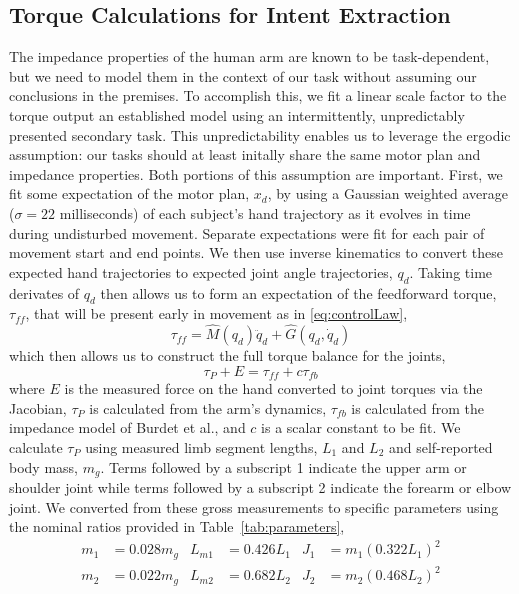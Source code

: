 \subsection*{Torque Calculations for Intent Extraction}
The impedance properties of the human arm are known to be task-dependent\cite{gomi1998task}, but we need to model them in the context of our task without assuming our conclusions in the premises. To accomplish this, we fit a linear scale factor to the torque output an established model using an intermittently, unpredictably presented secondary task. This unpredictability enables us to leverage the ergodic assumption: our tasks should at least initally share the same motor plan and impedance properties. Both portions of this assumption are important. First, we fit some expectation of the motor plan, $x_d$, by using a Gaussian weighted average ($\sigma=22$ milliseconds) of each subject's hand trajectory as it evolves in time during undisturbed movement. Separate expectations were fit for each pair of movement start and end points. We then use inverse kinematics to convert these expected hand trajectories to expected joint angle trajectories, $q_d$. Taking time derivates of $q_d$ then allows us to form an expectation of the feedforward torque, $\tau_{ff}$, that will be present early in movement as in \eqref{eq:controlLaw},
\begin{equation}
\tau_{ff}=\hat{M}(q_d)\ddot{q}_d+\hat{G}(q_d,\dot{q}_d)
\end{equation}
which then allows us to construct the full torque balance for the joints,
\begin{equation} \label{eq:torqueBalance}
\tau_P+E=\tau_{ff}+c\tau_{fb}
\end{equation}
where $E$ is the measured force on the hand converted to joint torques via the Jacobian, $\tau_P$ is calculated from the arm's dynamics, $\tau_{fb}$ is calculated from the impedance model of Burdet et al.\cite{burdet2006stability}, and $c$ is a scalar constant to be fit. We calculate $\tau_P$ using measured limb segment lengths, $L_1$ and $L_2$ and self-reported body mass, $m_g$. Terms followed by a subscript 1 indicate the upper arm or shoulder joint while terms followed by a subscript 2 indicate the forearm or elbow joint. We converted from these gross measurements to specific parameters using the nominal ratios provided in Table~\ref{tab:parameters},
\begin{align}
m_1 &=0.028 m_g & L_{m1}&=0.426 L_1 & J_1&=m_1(0.322 L_1)^2 \\  
m_2 &=0.022 m_g & L_{m2}&=0.682 L_2 & J_2&=m_2(0.468 L_2)^2
\end{align}
